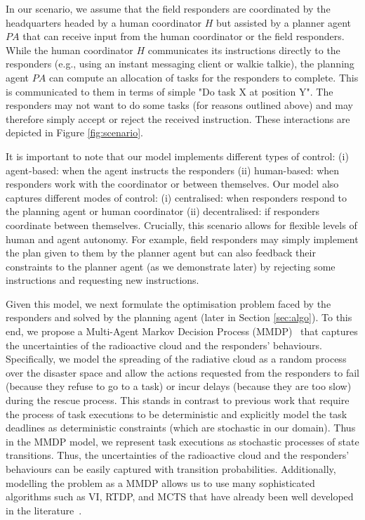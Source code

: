 In our scenario, we assume that the field responders are coordinated by the headquarters headed by a human coordinator $H$ but assisted by a planner agent $PA$ that can receive input from the human coordinator or the field responders.  While the human coordinator $H$ communicates its instructions directly to the responders (e.g., using an instant messaging client or walkie talkie), the planning agent $PA$ can compute an allocation of tasks for the responders to complete. This is communicated to them in terms of simple "Do task X at position Y". The responders may not want to do some tasks (for reasons outlined above) and may therefore simply accept or reject the received instruction. These interactions are depicted in Figure \ref{fig:scenario}.  

It is important to note that our model implements different types of control: (i) agent-based: when the agent instructs the responders (ii) human-based: when responders work with the coordinator or between themselves. Our model also captures different modes of control: (i) centralised: when responders respond to the planning agent or human coordinator (ii) decentralised: if responders coordinate between themselves. Crucially, this scenario allows for flexible levels of human and agent autonomy. For example, field responders may simply implement the plan given to them by the planner agent but can also feedback their constraints to the planner agent (as we demonstrate later) by rejecting some instructions and requesting new instructions.

Given this model, we next formulate the optimisation problem faced by the responders  and solved by the planning agent (later  in Section \ref{sec:algo}). To this end, we propose a Multi-Agent Markov Decision Process (MMDP)~\cite{?} that captures the uncertainties of the radioactive cloud and the responders' behaviours. Specifically, we model the spreading of the radiative cloud as a random process over the disaster space and allow the actions requested from the responders to  fail (because they refuse to go to a  task) or incur delays (because they are too slow) during the rescue process. This stands in contrast to previous work \cite{csftp,HTSSC} that require the process of task executions to be deterministic and explicitly model the task deadlines as deterministic constraints (which are stochastic in our domain). Thus in the MMDP model, we represent  task executions as stochastic processes of state transitions. Thus, the uncertainties of the radioactive cloud and the responders' behaviours can be easily captured with transition probabilities. Additionally, modelling the problem as a MMDP allows us to use many sophisticated algorithms such as VI, RTDP, and MCTS that have already been well developed in the literature~\cite{?,?,?}.



